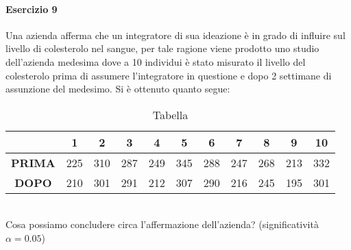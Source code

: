 \documentclass[12pt]{article}
\begin{document}
    \paragraph{Esercizio 9}
    Una azienda afferma che un integratore di sua ideazione è in grado di influire sul livello di colesterolo nel sangue, per tale ragione viene prodotto uno studio dell’azienda medesima dove a 10 individui è stato misurato il livello del colesterolo prima di assumere l’integratore in questione e dopo 2 settimane di assunzione del medesimo. Si è ottenuto quanto segue:
    \begin{table}[!htb]
        \centering
        \begin{tabular}{c|c|c|c|c|c|c|c|c|c|c|}
        \cline{2-11}
        \multicolumn{1}{l|}{}                & \textbf{1} & \textbf{2} & \textbf{3} & \textbf{4} & \textbf{5} & \textbf{6} & \textbf{7} & \textbf{8} & \textbf{9} & \textbf{10} \\ \hline
        \multicolumn{1}{|c|}{\textbf{PRIMA}} & 225        & 310        & 287        & 249        & 345        & 288        & 247        & 268        & 213        & 332         \\ \hline
        \multicolumn{1}{|c|}{\textbf{DOPO}}  & 210        & 301        & 291        & 212        & 307        & 290        & 216        & 245        & 195        & 301         \\ \hline
        \end{tabular}
        \caption{Tabella}
        \label{tab:my-table8}
    \end{table}
    \\Cosa possiamo concludere circa l’affermazione dell’azienda? (significatività $\alpha=0.05$)
    \newpage
\end{document}
